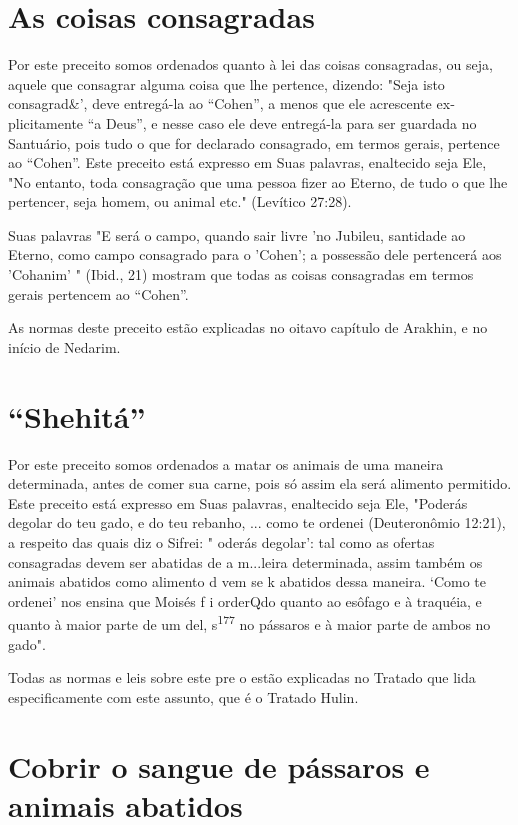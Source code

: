 \section{As coisas consagradas}

Por este preceito somos ordenados quanto à lei das coisas consagra­das,
ou seja, aquele que consagrar alguma coisa que lhe pertence, dizendo:
"Seja isto consagrad\&', deve entregá-la ao ``Cohen'', a menos que ele
acrescente ex­plicitamente ``a Deus'', e nesse caso ele deve entregá-la
para ser guardada no Santuário, pois tudo o que for declarado
consagrado, em termos gerais, perten­ce ao ``Cohen''. Este preceito está
expresso em Suas palavras, enaltecido seja Ele, "No entanto, toda
consagração que uma pessoa fizer ao Eterno, de tudo o que lhe pertencer,
seja homem, ou animal etc." (Levítico 27:28).

Suas palavras "E será o campo, quando sair livre 'no Jubileu, santida­de
ao Eterno, como campo consagrado para o 'Cohen'; a possessão dele
per­tencerá aos 'Cohanim' " (Ibid., 21) mostram que todas as coisas
consagradas em termos gerais pertencem ao ``Cohen''.

As normas deste preceito estão explicadas no oitavo capítulo de
Arak­hin, e no início de Nedarim.

\section{``Shehitá''}

Por este preceito somos ordenados a matar os animais de uma ma­neira
determinada, antes de comer sua carne, pois só assim ela será alimento
permitido. Este preceito está expresso em Suas palavras, enaltecido seja
Ele, "Poderás degolar do teu gado, e do teu rebanho, ... como te ordenei
(Deutero­nômio 12:21), a respeito das quais diz o Sifrei: " oderás
degolar': tal como as ofertas consagradas devem ser abatidas de a
m...leira determinada, assim também os animais
abatidos como alimento d vem se k abatidos dessa maneira. `Como te
ordenei' nos ensina que Moisés f i orderQdo quanto ao esôfago e à
traquéia, e quanto à maior parte de um del, s\textsuperscript{177} no
pássaros e à maior parte de ambos no gado".

Todas as normas e leis sobre este pre o estão explicadas no Trata­do que
lida especificamente com este assunto, que é o Tratado Hulin.

\section{Cobrir o sangue de pássaros e animais abatidos}

